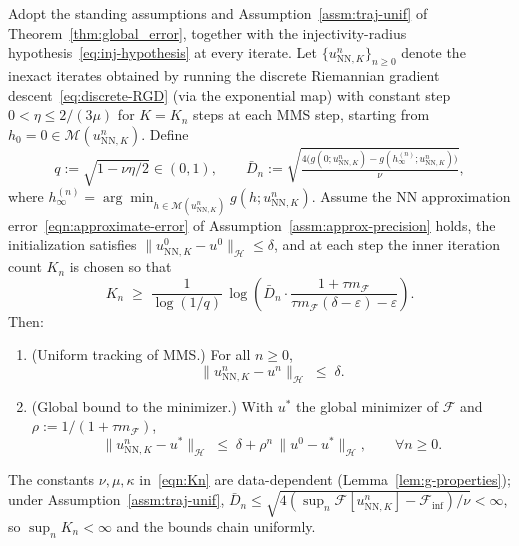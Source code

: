 \documentclass[twoside,11pt]{article}
\newcommand{\NN}{\mathrm{NN}}
\newcommand{\calF}{\mathcal{F}}
\newcommand{\calH}{\mathcal{H}}
\newcommand{\calM}{\mathcal{M}}
\begin{document}
\begin{theorem}\label{thm:global_error-RGD}
Adopt the standing assumptions and Assumption~\ref{assm:traj-unif} of Theorem~\ref{thm:global_error}, together with the injectivity-radius hypothesis~\eqref{eq:inj-hypothesis} at every iterate. Let $\{u^n_{\NN,K}\}_{n\ge 0}$ denote the inexact iterates obtained by running the discrete Riemannian gradient descent~\eqref{eq:discrete-RGD} (via the exponential map) with constant step $0<\eta\le 2/(3\mu)$ for $K=K_n$ steps at each MMS step, starting from $h_0=0\in\calM(u^n_{\NN,K})$. Define
\begin{equation}\label{eq:Dbar-def}
    q := \sqrt{1-\nu\eta/2}\in(0,1),\qquad
    \bar D_n := \sqrt{\tfrac{4\bigl(g(0;u^n_{\NN,K}) - g(h^{(n)}_\infty;u^n_{\NN,K})\bigr)}{\nu}},
\end{equation}
where $h^{(n)}_\infty=\arg\min_{h\in\calM(u^n_{\NN,K})}g(h;u^n_{\NN,K})$. Assume the NN approximation error~\eqref{eqn:approximate-error} of Assumption~\ref{assm:approx-precision} holds, the initialization satisfies $\|u^0_{\NN,K}-u^0\|_\calH\le\delta$, and at each step the inner iteration count $K_n$ is chosen so that
\begin{equation}\label{eqn:Kn}
    K_n \;\ge\; \frac{1}{\log(1/q)}\,\log\!\left(\bar D_n\cdot\frac{1+\tau m_\calF}{\tau m_\calF(\delta-\varepsilon)-\varepsilon}\right).
\end{equation}
Then:
\begin{enumerate}
\item[(a).] (Uniform tracking of MMS.) For all $n\ge 0$,
\[
\|u^n_{\NN,K}-u^n\|_\calH \;\le\; \delta.
\]
\item[(b).] (Global bound to the minimizer.) With $u^*$ the global minimizer of $\calF$ and $\rho:=1/(1+\tau m_\calF)$,
\[
\|u^n_{\NN,K}-u^*\|_\calH \;\le\; \delta + \rho^n\,\|u^0-u^*\|_\calH,\qquad \forall n\ge 0.
\]
\end{enumerate}
The constants $\nu,\mu,\kappa$ in~\eqref{eqn:Kn} are data-dependent (Lemma~\ref{lem:g-properties}); under Assumption~\ref{assm:traj-unif}, $\bar D_n\le \sqrt{4(\sup_n\calF[u^n_{\NN,K}]-\calF_{\inf})/\nu}<\infty$, so $\sup_n K_n<\infty$ and the bounds chain uniformly.
\end{theorem}
\end{document}
